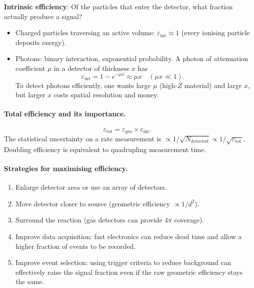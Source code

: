 \textbf{Intrinsic efficiency}: Of the particles that enter the detector, what
fraction actually produce a signal?
\begin{itemize}
  \item Charged particles traversing an active volume: $\varepsilon_\text{int} \approx 1$
  (every ionising particle deposits energy).
  \item Photons: binary interaction, exponential probability.  A photon of
  attenuation coefficient $\mu$ in a detector of thickness $x$ has
  \begin{equation}
    \label{eq:lec07:photon_int_eff}
    \varepsilon_\text{int} = 1 - e^{-\mu x} \approx \mu x \quad (\mu x \ll 1).
  \end{equation}
  To detect photons efficiently, one wants large $\mu$ (high-$Z$ material) and
  large $x$, but larger $x$ costs spatial resolution and money.
\end{itemize}

\paragraph{Total efficiency and its importance.}
\begin{equation}
  \label{eq:lec07:total_eff}
  \boxed{\varepsilon_\text{tot} = \varepsilon_\text{geo} \times \varepsilon_\text{int}.}
\end{equation}
The statistical uncertainty on a rate measurement is $\propto 1/\sqrt{N_\text{detected}}
\propto 1/\sqrt{\varepsilon_\text{tot}}$.  Doubling efficiency is equivalent to quadrupling
measurement time.


\paragraph{Strategies for maximising efficiency.}
\begin{enumerate}
  \item Enlarge detector area or use an array of detectors.
  \item Move detector closer to source (geometric efficiency $\propto 1/d^2$).
  \item Surround the reaction (gas detectors can provide $4\pi$ coverage).
  \item Improve data acquisition: fast electronics can reduce dead time and
  allow a higher fraction of events to be recorded.
  \item Improve event selection: using trigger criteria to reduce background
  can effectively raise the signal fraction even if the raw geometric efficiency
  stays the same.
\end{enumerate}

